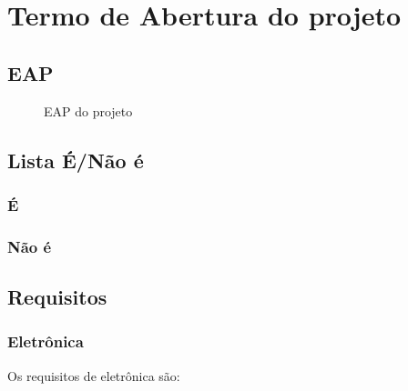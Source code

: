 \chapter{Termo de Abertura do projeto}

\section{EAP}
\begin{figure}[!htb]
    \caption{\label{fig:eap} EAP do projeto}
\end{figure}
\section{Lista É/Não é}
\subsection{É}
\subsection{Não é}
\section{Requisitos}
\subsection{Eletrônica}

Os requisitos de eletrônica são:
	
